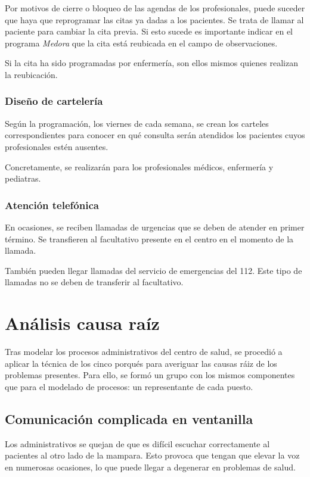Por motivos de cierre o bloqueo de las agendas de los profesionales, puede suceder que haya que reprogramar las citas ya dadas a los pacientes.
Se trata de llamar al paciente para cambiar la cita previa. Si esto sucede es importante indicar en el programa \textit{Medora} que la cita está reubicada en el campo de observaciones.

Si la cita ha sido programadas por enfermería, son ellos mismos quienes realizan la reubicación.

\subsubsection{Diseño de cartelería}

Según la programación, los viernes de cada semana, se crean los carteles correspondientes para conocer en qué consulta serán atendidos los pacientes cuyos profesionales estén ausentes.

Concretamente, se realizarán para los profesionales médicos, enfermería y pediatras.

\subsubsection{Atención telefónica}

En ocasiones, se reciben llamadas de urgencias que se deben de atender en primer término. Se transfieren al facultativo presente en el centro en el momento de la llamada.

También pueden llegar llamadas del servicio de emergencias del 112. Este tipo de llamadas no se deben de transferir al facultativo.

\section{Análisis causa raíz}

Tras modelar los procesos administrativos del centro de salud, se procedió a aplicar la técnica de los cinco porqués para averiguar las causas ráiz de los problemas presentes. 
Para ello, se formó un grupo con los mismos componentes que para el modelado de procesos: un representante de cada puesto.

\subsection{Comunicación complicada en ventanilla}

Los administrativos se quejan de que es difícil escuchar correctamente al pacientes al otro lado de la mampara.
Esto provoca que tengan que elevar la voz en numerosas ocasiones, lo que puede llegar a degenerar en problemas de salud.

